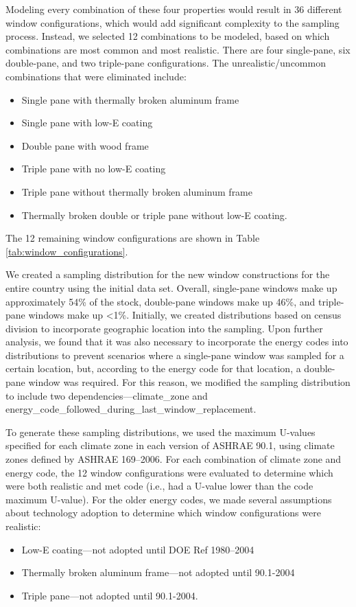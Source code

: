 Modeling every combination of these four properties would result in 36 different window configurations, which would add significant complexity to the sampling process. Instead, we selected 12 combinations to be modeled, based on which combinations are most common and most realistic. There are four single-pane, six double-pane, and two triple-pane configurations. The unrealistic/uncommon combinations that were eliminated include: 
\begin{itemize}
\item Single pane with thermally broken aluminum frame 
\item Single pane with low-E coating 
\item Double pane with wood frame 
\item Triple pane with no low-E coating 
\item Triple pane without thermally broken aluminum frame 
\item Thermally broken double or triple pane without low-E coating.  
\end{itemize}
The 12 remaining window configurations are shown in Table \ref{tab:window_configurations}.



We created a sampling distribution for the new window constructions for the entire country using the initial data set. Overall, single-pane windows make up approximately 54\% of the stock, double-pane windows make up 46\%, and triple-pane windows make up <1\%. Initially, we created distributions based on census division to incorporate geographic location into the sampling. Upon further analysis, we found that it was also necessary to incorporate the energy codes into distributions to prevent scenarios where a single-pane window was sampled for a certain location, but, according to the energy code for that location, a double-pane window was required. For this reason, we modified the sampling distribution to include two dependencies---climate\_zone and  energy\_code\_followed\_during\_last\_window\_replacement. 

To generate these sampling distributions, we used the maximum U-values specified for each climate zone in each version of ASHRAE 90.1, using climate zones defined by ASHRAE 169--2006. For each combination of climate zone and energy code, the 12 window configurations were evaluated to determine which were both realistic and met code (i.e., had a U-value lower than the code maximum U-value). For the older energy codes, we made several assumptions about technology adoption to determine which window configurations were realistic: 
\begin{itemize}
    \item Low-E coating---not adopted until DOE Ref 1980--2004 
    \item Thermally broken aluminum frame---not adopted until 90.1-2004 
    \item Triple pane---not adopted until 90.1-2004. 
\end{itemize}

